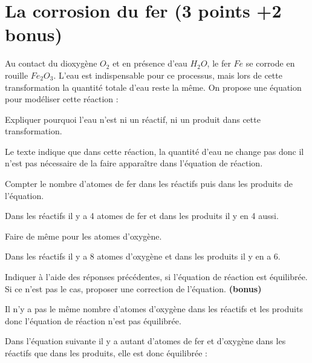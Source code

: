 
\section{La corrosion du fer (3 points +2 bonus)}\label{ex:corrosion}

Au contact du dioxygène $O_2$ et en présence d'eau $H_2O$, le fer $Fe$ se corrode en rouille $Fe_2O_3$. L'eau est indispensable pour ce processus, mais lors de cette transformation la quantité totale d'eau reste la même. On propose une équation pour modéliser cette réaction : 

\begin{center}
\end{center}


\begin{questions}
	\question[1] Expliquer pourquoi l'eau n'est ni un réactif, ni un produit dans cette transformation.
	\begin{solution}
		Le texte indique que dans cette réaction, la quantité d'eau ne change pas donc il n'est pas nécessaire de la faire apparaître dans l'équation de réaction.
	\end{solution}
	
	\question[1] Compter le nombre d'atomes de fer dans les réactifs puis dans les produits de l'équation.
	\begin{solution}
		Dans les réactifs il y a 4 atomes de fer et dans les produits il y en 4 aussi.
	\end{solution}
	
	\question[1] Faire de même pour les atomes d'oxygène.
	\begin{solution}
		Dans les réactifs il y a 8 atomes d'oxygène et dans les produits il y en a 6.
	\end{solution}
	
	\question[2] Indiquer à l'aide des réponses précédentes, si l'équation de réaction est équilibrée. Si ce n'est pas le cas, proposer une correction de l'équation. \textbf{(bonus)}
	\begin{solution}
		Il n'y a pas le même nombre d'atomes d'oxygène dans les réactifs et les produits donc l'équation de réaction n'est pas équilibrée. 
		
		Dans l'équation suivante il y a autant d'atomes de fer et d'oxygène dans les réactifs que dans les produits, elle est donc équilibrée :
		\begin{center}
		\end{center}
	\end{solution}
\end{questions}
